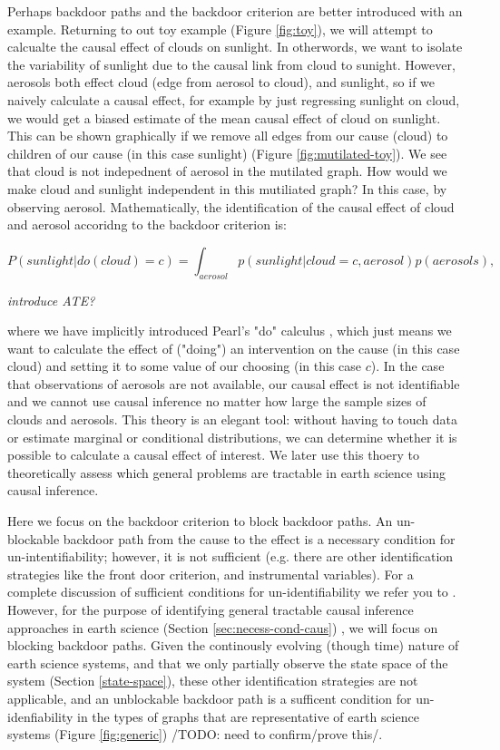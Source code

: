 \documentclass[12pt]{article}
\begin{document}
Perhaps backdoor paths and the backdoor criterion are better
introduced with an example. Returning to out toy example (Figure
\ref{fig:toy}), we will attempt to calcualte the causal effect of
clouds on sunlight. In otherwords, we want to isolate the variability
of sunlight due to the causal link from cloud to sunight. However,
aerosols both effect cloud (edge from aerosol to cloud), and sunlight,
so if we naively calculate a causal effect, for example by just
regressing sunlight on cloud, we would get a biased estimate of the
mean causal effect of cloud on sunlight. This can be shown graphically
if we remove all edges from our cause (cloud) to children of our cause
(in this case sunlight) (Figure \ref{fig:mutilated-toy}). We see that
cloud is not indepednent of aerosol in the mutilated graph. How would
we make cloud and sunlight independent in this mutiliated graph?  In
this case, by observing aerosol. Mathematically, the identification of
the causal effect of cloud and aerosol accoridng to the backdoor
criterion is:

\begin{equation}
  P(sunlight | do(cloud) = c) = \int_{aerosol} p(sunlight| cloud = c,
  aerosol) p(aerosols),
\end{equation}

\emph{introduce ATE?}

where we have implicitly introduced Pearl's "do" calculus
\citep{pearl2009}, which just means we want to calculate the effect of
("doing") an intervention on the cause (in this case cloud) and
setting it to some value of our choosing (in this case \(c\)). In the
case that observations of aerosols are not available, our causal
effect is not identifiable and we cannot use causal inference no
matter how large the sample sizes of clouds and aerosols. This theory
is an elegant tool: without having to touch data or estimate marginal
or conditional distributions, we can determine whether it is possible
to calculate a causal effect of interest. We later use this thoery to
theoretically assess which general problems are tractable in earth
science using causal inference.

Here we focus on the backdoor criterion to block backdoor paths. An
un-blockable backdoor path from the cause to the effect is a necessary
condition for un-intentifiability; however, it is not sufficient
(e.g. there are other identification strategies like the front door
criterion, and instrumental variables). For a complete discussion of
sufficient conditions for un-identifiability we refer you to
\citet{shpitser2006}. However, for the purpose of identifying general
tractable causal inference approaches in earth science (Section
\ref{sec:necess-cond-caus}) , we will focus on blocking backdoor
paths. Given the continously evolving (though time) nature of earth
science systems, and that we only partially observe the state space of
the system (Section \ref{state-space}), these other identification
strategies are not applicable, and an unblockable backdoor path is a
sufficent condition for un-idenfiability in the types of graphs that
are representative of earth science systems (Figure \ref{fig:generic})
/TODO: need to confirm/prove this/.
\end{document}
